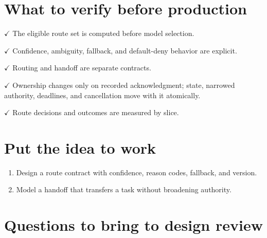\section{What to verify before production}

\textbf{\ensuremath{\checkmark}} The eligible route set is computed before model selection.\par

\textbf{\ensuremath{\checkmark}} Confidence, ambiguity, fallback, and default-deny behavior are explicit.\par

\textbf{\ensuremath{\checkmark}} Routing and handoff are separate contracts.\par

\textbf{\ensuremath{\checkmark}} Ownership changes only on recorded acknowledgment; state, narrowed authority, deadlines, and cancellation move with it atomically.\par

\textbf{\ensuremath{\checkmark}} Route decisions and outcomes are measured by slice.\par

\section{Put the idea to work}

\begin{enumerate}

\item Design a route contract with confidence, reason codes, fallback, and version.

\item Model a handoff that transfers a task without broadening authority.

\end{enumerate}

\section{Questions to bring to design review}

